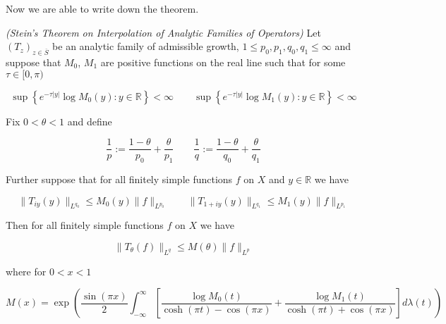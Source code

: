 \vspace{2mm}

Now we are able to write down the theorem.

\vspace{2mm}

\begin{mdframed}
	\begin{theorem}\emph{(Stein's Theorem on Interpolation of Analytic Families of Operators)}
		Let $\left( T_z \right)_{z \in \overline{S}}$ be an analytic family of admissible growth, $1 \leqslant p_0,p_1,q_0,q_1 \leqslant \infty$ and suppose that $M_0$, $M_1$ are positive functions on the real line such that for some $\tau \in [0,\pi)$

			\begin{equation}
				\sup\left\{e^{-\tau \vert y \vert} \log M_0(y) : y \in \mathbb{R}\right\} < \infty \qquad \sup\left\{e^{-\tau \vert y \vert} \log M_1(y) : y \in \mathbb{R}\right\} < \infty
			\end{equation}

			Fix $0 < \theta < 1$ and define

			\begin{equation}
				\frac{1}{p} := \frac{1 - \theta}{p_0} + \frac{\theta}{p_1} \qquad \frac{1}{q} := \frac{1 - \theta}{q_0} + \frac{\theta}{q_1}
			\end{equation}

			Further suppose that for all finitely simple functions $f$ on $X$ and $y \in \mathbb{R}$ we have

			\begin{equation}
				\|T_{iy}(y)\|_{L^{q_0}} \leqslant M_0(y)\|f\|_{L^{p_0}} \qquad \|T_{1 + iy}(y)\|_{L^{q_1}} \leqslant M_1(y)\|f\|_{L^{p_1}} 
			\end{equation}

			Then for all finitely simple functions $f$ on $X$ we have

			\begin{equation*}
				\|T_\theta(f)\|_{L^q} \leqslant M(\theta)\|f\|_{L^p}
			\end{equation*}

			where for $0 < x < 1$

			\begin{equation*}
				M(x) = \exp\left( \frac{\sin(\pi x)}{2} \int_{-\infty}^\infty \left[ \frac{\log M_0(t)}{\cosh(\pi t) - \cos(\pi x)} + \frac{\log M_1(t)}{\cosh(\pi t) + \cos(\pi x)}\right] d\lambda(t) \right)
			\end{equation*}
	\end{theorem}
\end{mdframed}

